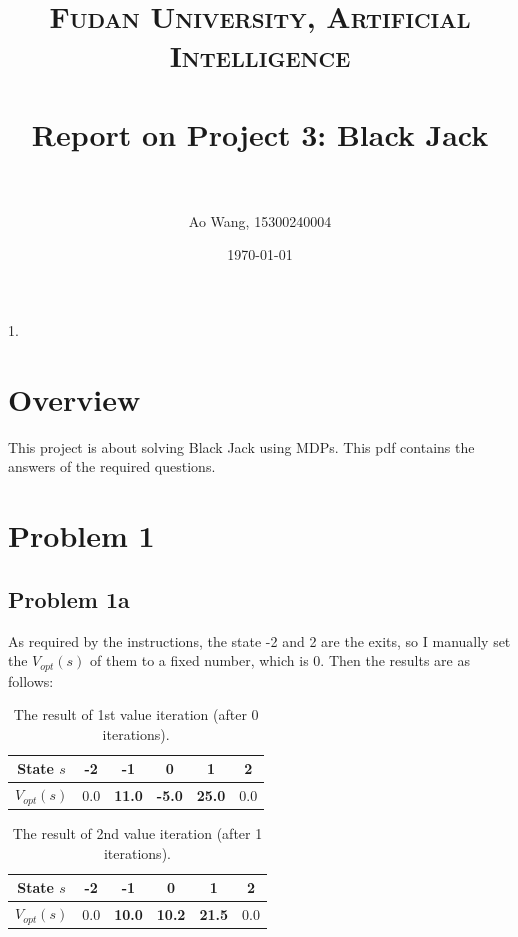 \documentclass[paper=a4, fontsize=10pt]{scrartcl} %
\title{	
\normalfont \normalsize 
\textsc{Fudan University, Artificial Intelligence} \\ [0pt] %
\horrule{1pt} \\[0.4cm] %
\LARGE Report on Project 3: Black Jack \\ %
\horrule{1pt} \\[0cm] %
}
\author{Ao Wang, 15300240004} %
\date{\normalsize\today} %
\numberwithin{equation}{section} %
\numberwithin{figure}{section} %
\numberwithin{table}{section} %
\begin{document}
\begin{spacing}{1.}

\maketitle %

\section{Overview}
This project is about solving Black Jack using MDPs. This pdf contains the answers of the required questions.

\section{Problem 1}
\subsection{Problem 1a}
As required by the instructions, the state -2 and 2 are the exits, so I manually set the $V_{opt}(s)$ of them to a fixed number, which is 0. Then the results are as follows:
\begin{table}[h]
\setlength{\abovecaptionskip}{0.cm}
\setlength{\belowcaptionskip}{-0.cm}
\centering
  \caption{The result of 1st value iteration (after 0 iterations).}
  \begin{tabular}{|c|c|c|c|c|c|}
     \hline
    State $s$ & -2 & -1 & 0 & 1 & 2\\
     \hline
    $V_{opt}(s)$ & 0.0 & \textbf{11.0} & \textbf{-5.0} & \textbf{25.0} & 0.0\\
     \hline
  \end{tabular}
\end{table}

\begin{table}[h]
\setlength{\abovecaptionskip}{0.cm}
\setlength{\belowcaptionskip}{-0.cm}
\centering
  \caption{The result of 2nd value iteration (after 1 iterations).}
  \begin{tabular}{|c|c|c|c|c|c|}
     \hline
    State $s$ & -2 & -1 & 0 & 1 & 2\\
     \hline
    $V_{opt}(s)$ & 0.0 & \textbf{10.0} & \textbf{10.2} & \textbf{21.5} & 0.0\\
     \hline
  \end{tabular}
\end{table}


\end{spacing}
\end{document}
